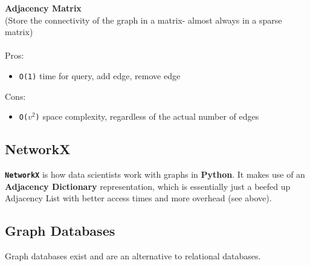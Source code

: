 \documentclass[english, 10pt]{article}
\begin{document}
\begin{myproof}
\textbf{Adjacency Matrix}\\
(Store the connectivity of the graph in a matrix- almost always in a sparse matrix)\\\\
Pros:
\begin{itemize}
	\item \texttt{O(1)} time for query, add edge, remove edge
\end{itemize}
Cons:
\begin{itemize}
	\item \texttt{O($v^2$)} space complexity, regardless of the actual number of edges
\end{itemize}
\end{myproof}

\subsection{NetworkX}

\texttt{\textbf{NetworkX}} is how data scientists work with graphs in \textbf{Python}. It makes use of an \textbf{Adjacency Dictionary} representation, which is essentially just a beefed up Adjacency List with better access times and more overhead (see above).

\subsection{Graph Databases}

Graph databases exist and are an alternative to relational databases. \\
\end{document}
